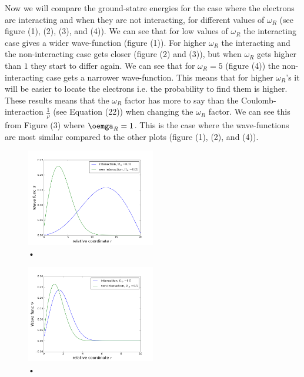 \documentclass[%
 reprint,
 nobalancelastpage,
 amsmath,amssymb,
 aps,
]{revtex4-1}
\begin{document}
Now we will compare the ground-statre energies for the case where the electrons are interacting and when they are not interacting, for different values of $\omega_R$ (see figure (1), (2), (3), and (4)). We can see that for low values of $\omega_R$ the interacting case gives a wider wave-function (figure (1)). For higher $\omega_R$ the interacting and the non-interacting case gets closer (figure (2) and (3)), but when $\omega_R$ gets higher than $1$ they start to differ again. We can see that for $\omega_R = 5$ (figure (4)) the non-interacting case gets a narrower wave-function. This means that for higher $\omega_R$'s it will be easier to locate the electrons i.e. the probability to find them is higher. \\
These results means that the $\omega_R$ factor has more to say than the Coulomb-interaction $\frac{1}{\rho}$ (see Equation (22)) when changing the $\omega_R$ factor. We can see this from Figure (3) where $\oemga_R = 1$. This is the case where the wave-functions are most similar compared to the other plots (figure (1), (2), and (4)).

 \begin{figure}[h]
\centering
\includegraphics[width=0.5\textwidth]{../omega001.png}
\caption{•}
\label{fig:my_label}
\end{figure}

 \begin{figure}[h]
\centering
\includegraphics[width=0.5\textwidth]{../omega05.png}
\caption{•}
\label{fig:my_label}
\end{figure}
\end{document}
